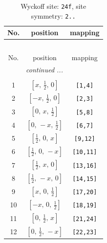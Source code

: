 \documentclass[fleqn,8pt]{jsarticle}
\begin{document}
\begin{longtable}{ccc}
\caption{Wyckoff site: {\tt 24f}, site symmetry: {\tt 2..}}
 \\
 \hline \hline
No. & position & mapping \\ \hline \endfirsthead

\multicolumn{2}{l}{\tablename\ \thetable{}} \\
 \hline \hline
No. & position & mapping \\ \hline \endhead

 \hline \hline
\multicolumn{2}{r}{\footnotesize\it continued ...} \\ \endfoot

 \hline \hline
\multicolumn{2}{r}{} \\ \endlastfoot

1 & $\left[ x,\, \frac{1}{2},\, 0 \right]$ & {\tt [1,4]} \\ \hline
2 & $\left[ - x,\, \frac{1}{2},\, 0 \right]$ & {\tt [2,3]} \\ \hline
3 & $\left[ 0,\, x,\, \frac{1}{2} \right]$ & {\tt [5,8]} \\ \hline
4 & $\left[ 0,\, - x,\, \frac{1}{2} \right]$ & {\tt [6,7]} \\ \hline
5 & $\left[ \frac{1}{2},\, 0,\, x \right]$ & {\tt [9,12]} \\ \hline
6 & $\left[ \frac{1}{2},\, 0,\, - x \right]$ & {\tt [10,11]} \\ \hline
7 & $\left[ \frac{1}{2},\, x,\, 0 \right]$ & {\tt [13,16]} \\ \hline
8 & $\left[ \frac{1}{2},\, - x,\, 0 \right]$ & {\tt [14,15]} \\ \hline
9 & $\left[ x,\, 0,\, \frac{1}{2} \right]$ & {\tt [17,20]} \\ \hline
10 & $\left[ - x,\, 0,\, \frac{1}{2} \right]$ & {\tt [18,19]} \\ \hline
11 & $\left[ 0,\, \frac{1}{2},\, x \right]$ & {\tt [21,24]} \\ \hline
12 & $\left[ 0,\, \frac{1}{2},\, - x \right]$ & {\tt [22,23]} \\
\end{longtable}
\renewcommand{\arraystretch}{1.2}
\end{document}
